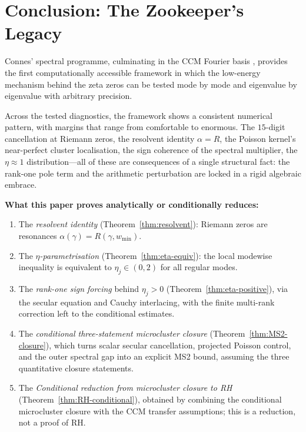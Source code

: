 \documentclass[12pt,a4paper]{article}
\theoremstyle{definition}
\theoremstyle{remark}
\newcommand{\wmin}{w_{\min}}
\begin{document}
\section{Conclusion: The Zookeeper's Legacy}
\label{sec:conclusion}

Connes' spectral programme, culminating in the CCM Fourier basis
\cite{CCM2025}, provides the first computationally accessible
framework in which the low-energy mechanism behind the zeta zeros can be
tested mode by mode and eigenvalue by eigenvalue with arbitrary
precision.

Across the tested diagnostics, the framework shows a consistent
numerical pattern, with margins that range from comfortable to enormous.
The $15$-digit cancellation at Riemann zeros, the resolvent identity
$\alpha = R$, the Poisson kernel's near-perfect cluster localisation,
the sign coherence of the spectral multiplier, the $\eta \approx 1$
distribution---all of these are consequences of a single structural
fact: the rank-one pole term and the arithmetic perturbation are locked
in a rigid algebraic embrace.

\medskip
\noindent\textbf{What this paper proves analytically or conditionally reduces:}
\begin{enumerate}[label=(\roman*)]
\item The \emph{resolvent identity} (Theorem~\ref{thm:resolvent}):
  Riemann zeros are resonances $\alpha(\gamma) = R(\gamma, \wmin)$.
\item The \emph{$\eta$-parametrisation} (Theorem~\ref{thm:eta-equiv}):
  the local modewise inequality is equivalent to $\eta_j \in (0,2)$ for
  all regular modes.
\item The \emph{rank-one sign forcing} behind $\eta_j > 0$
  (Theorem~\ref{thm:eta-positive}), via the secular equation and Cauchy
  interlacing, with the finite multi-rank correction left to the
  conditional estimates.
\item The \emph{conditional three-statement microcluster closure}
  (Theorem~\ref{thm:MS2-closure}), which turns scalar secular
  cancellation, projected Poisson control, and the outer spectral gap
  into an explicit MS2 bound, assuming the three quantitative closure
  statements.
\item The \emph{Conditional reduction from microcluster closure to RH}
  (Theorem~\ref{thm:RH-conditional}), obtained by combining the
  conditional microcluster closure with the CCM transfer assumptions;
  this is a reduction, not a proof of RH.
\end{enumerate}
\end{document}
